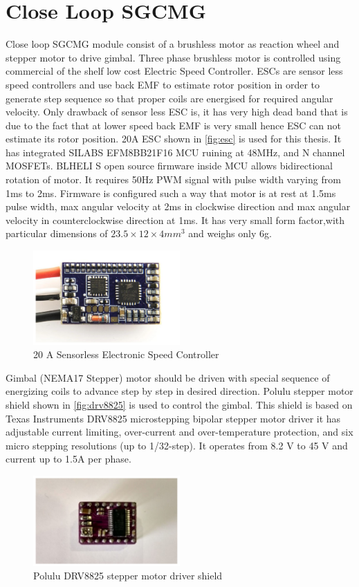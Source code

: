 \section{Close Loop SGCMG}
Close loop SGCMG module consist of a brushless motor as reaction wheel and stepper motor to drive gimbal. Three phase brushless motor is controlled using commercial of the shelf low cost Electric Speed Controller. ESCs are sensor less speed controllers and use back EMF to estimate rotor position in order to generate step sequence so that proper coils are energised for required angular velocity. Only drawback of sensor less ESC is, it has very high dead band that is due to the fact that at lower speed back EMF is very small hence ESC can not estimate its rotor position. 20A ESC shown in \autoref{fig:esc} is used for this thesis. It has integrated SILABS EFM8BB21F16 MCU ruining at 48MHz, and N channel MOSFETs. BLHELI S open source firmware inside MCU allows bidirectional rotation of motor. It requires 50Hz PWM signal with pulse width varying from 1ms to 2ms. Firmware is configured such a way that motor is at rest at 1.5ms pulse width, max angular velocity at 2ms in clockwise direction and max angular velocity in counterclockwise direction at 1ms. It has very small form factor,with particular dimensions of $23.5\times12\times4mm^3$ and weighs only 6g.
\begin{figure}[ht]
    \centering
    \includegraphics[width=0.5\textwidth]{figures/Assembly/ESC.pdf}
    \caption{20 A Sensorless Electronic Speed Controller}
    \label{fig:esc}
\end{figure}

\noindent Gimbal (NEMA17 Stepper) motor should be driven with special sequence of energizing coils to advance step by step in desired direction. Polulu stepper motor shield shown in \autoref{fig:drv8825} is used to control the gimbal. This shield is based on Texas Instruments DRV8825 microstepping bipolar stepper motor driver it has adjustable current limiting, over-current and over-temperature protection, and six micro stepping resolutions (up to 1/32-step). It operates from 8.2 V to 45 V and current up to 1.5A per phase.
\begin{figure}[ht]
    \centering
    \includegraphics[width=0.5\textwidth]{figures/Assembly/drv8825.pdf}
    \caption{Polulu DRV8825 stepper motor driver shield}
    \label{fig:drv8825}
\end{figure}


